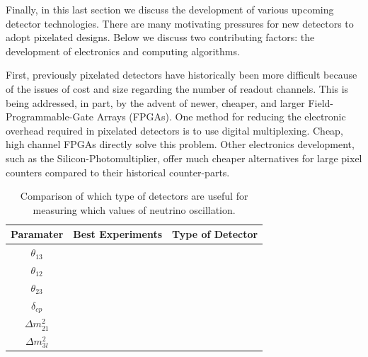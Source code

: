Finally, in this last section we discuss the development of various upcoming detector technologies.
There are many motivating pressures for new detectors to adopt pixelated designs. 
Below we discuss two contributing factors: the development of electronics and computing algorithms.

First, previously pixelated detectors have historically been more difficult because of the issues of cost and size regarding the number of readout channels.
This is being addressed, in part, by the advent of newer, cheaper, and larger Field-Programmable-Gate Arrays (FPGAs).
One method for reducing the electronic overhead required in pixelated detectors is to use digital multiplexing.
Cheap, high channel FPGAs directly solve this problem. 
Other electronics development, such as the Silicon-Photomultiplier, offer much cheaper alternatives for large pixel counters compared to their historical counter-parts.

\begin{table}
\begin{center}
\begin{tabular}{||c c c||}
 \hline
 Paramater & Best Experiments & Type of Detector \\ [0.5ex]
 \hline\hline
  $\theta_{13}$ & & \\
 \hline
  $\theta_{12}$ & & \\
 \hline
  $\theta_{23}$ & & \\
 \hline
  $\delta_{cp}$ & & \\
 \hline
  $\Delta m_{21}^{2}$ & & \\
 \hline
  $\Delta m_{3l}^{2}$ & & \\
 \hline
\end{tabular}
\caption{Comparison of which type of detectors are useful for measuring which values of neutrino oscillation.}
\end{center}
\end{table}
~\label{table:pmns_detectors}



